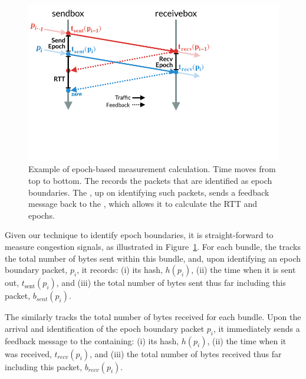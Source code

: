 \begin{figure}
    \centering
    \includegraphics[width=\columnwidth]{img/rate-calculation}
    \caption{Example of epoch-based measurement calculation. Time moves from top to bottom.
    The \inbox records the packets that are identified as epoch boundaries. 
    The \outbox, up on identifying such packets, sends a feedback message back to
    the \inbox, which allows it to calculate the RTT and epochs.
    }\label{fig:ratecalc}
\end{figure}

Given our technique to identify epoch boundaries, it is straight-forward to measure congestion signals, as illustrated in Figure~\ref{fig:ratecalc}.
For each bundle, the \inbox tracks the total number of bytes sent within this bundle, and, upon identifying an epoch boundary packet, $p_i$, it records: (i) its hash, $h(p_i)$, (ii) the time when it is sent out, $t_{\text{sent}}(p_i)$, and (iii) the total number of bytes sent thus far including this packet, $b_{sent}(p_i)$. 

The \outbox similarly tracks the total number of bytes received for each bundle. Upon the arrival and identification of the epoch boundary packet $p_i$, it immediately sends a feedback message to the \inbox containing: (i) its hash, $h(p_i)$, (ii) the time when it was received, $t_{recv}(p_i)$, and (iii) the total number of bytes received thus far including this packet, $b_{recv}(p_i)$. 

